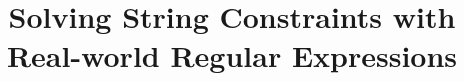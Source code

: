 \documentclass{llncs}
\begin{document}
\title{Solving String Constraints with \\
Real-world Regular Expressions}



\author{}
\institute{}

\maketitle


\end{document}
